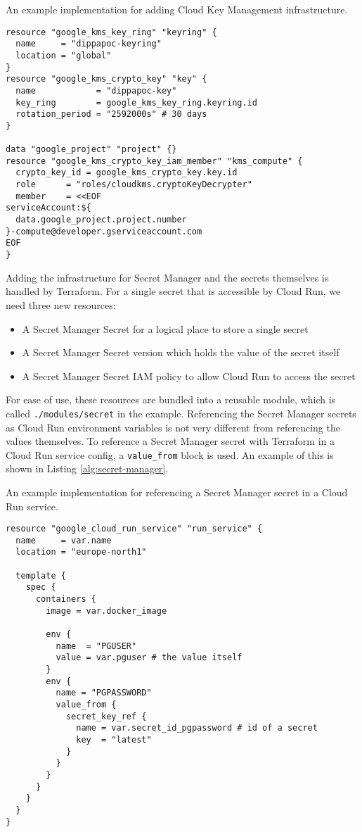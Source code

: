 \begin{breakablealgorithm}
\caption{An example implementation for adding Cloud Key Management infrastructure.}
\begin{verbatim}
resource "google_kms_key_ring" "keyring" {
  name     = "dippapoc-keyring"
  location = "global"
}
resource "google_kms_crypto_key" "key" {
  name            = "dippapoc-key"
  key_ring        = google_kms_key_ring.keyring.id
  rotation_period = "2592000s" # 30 days
}

data "google_project" "project" {}
resource "google_kms_crypto_key_iam_member" "kms_compute" {
  crypto_key_id = google_kms_crypto_key.key.id
  role      = "roles/cloudkms.cryptoKeyDecrypter"
  member    = <<EOF
serviceAccount:${
  data.google_project.project.number
}-compute@developer.gserviceaccount.com
EOF
}
\end{verbatim}
\label{alg:kms}
\end{breakablealgorithm}

Adding the infrastructure for Secret Manager and the secrets themselves is handled by Terraform.
For a single secret that is accessible by Cloud Run, we need three new resources:
\begin{itemize}
    \item A Secret Manager Secret for a logical place to store a single secret
    \item A Secret Manager Secret version which holds the value of the secret itself
    \item A Secret Manager Secret IAM policy to allow Cloud Run to access the secret
\end{itemize}
For ease of use, these resources are bundled into a reusable module, which is called \texttt{./modules/secret} in the example.
Referencing the Secret Manager secrets as Cloud Run environment variables is not very different from referencing the values themselves.
To reference a Secret Manager secret with Terraform in a Cloud Run service config, a \texttt{value\_from} block is used.
An example of this is shown in Listing \ref{alg:secret-manager}.

\begin{breakablealgorithm}
\caption{An example implementation for referencing a Secret Manager secret in a Cloud Run service.}
\begin{verbatim}
resource "google_cloud_run_service" "run_service" {
  name     = var.name
  location = "europe-north1"

  template {
    spec {
      containers {
        image = var.docker_image
        
        env {
          name  = "PGUSER"
          value = var.pguser # the value itself
        }
        env {
          name = "PGPASSWORD"
          value_from {
            secret_key_ref {
              name = var.secret_id_pgpassword # id of a secret
              key  = "latest"
            }
          }
        }
      }
    }
  }
}
\end{verbatim}
\label{alg:secret-manager}
\end{breakablealgorithm}
